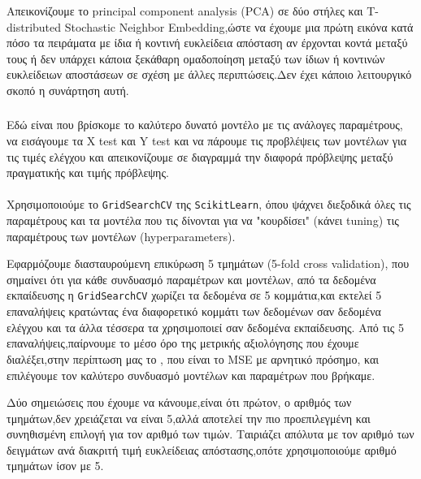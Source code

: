 Απεικονίζουμε το principal component analysis (PCA) σε δύο στήλες και T-distributed Stochastic Neighbor Embedding,ώστε 
να έχουμε μια πρώτη εικόνα κατά πόσο τα πειράματα με ίδια ή κοντινή ευκλείδεια απόσταση 
αν έρχονται κοντά μεταξύ τους ή δεν υπάρχει κάποια ξεκάθαρη ομαδοποίηση μεταξύ των ίδιων ή κοντινών ευκλείδειων αποστάσεων
σε σχέση με άλλες περιπτώσεις.Δεν έχει κάποιο λειτουργικό σκοπό η συνάρτηση αυτή.

\subsubsection{\texttt{}}

Εδώ είναι που βρίσκομε το καλύτερο δυνατό μοντέλο με τις ανάλογες παραμέτρους,
να εισάγουμε τα X test και Y test και να πάρουμε τις προβλέψεις των μοντέλων για τις τιμές ελέγχου
και απεικονίζουμε σε διαγραμμά την διαφορά πρόβλεψης μεταξύ πραγματικής και τιμής πρόβλεψης.

\paragraph{ \texttt{}}

Χρησιμοποιούμε το \texttt{GridSearchCV} της \texttt{Scikit\-Learn},
όπου ψάχνει διεξοδικά όλες τις παραμέτρους και τα μοντέλα που τις δίνονται για να "κουρδίσει" (κάνει tuning)
τις παραμέτρους των μοντέλων (hyperparameters).

Εφαρμόζουμε διασταυρούμενη επικύρωση 5 τμημάτων (5-fold cross validation), που σημαίνει ότι για κάθε συνδυασμό παραμέτρων και μοντέλων,
από τα δεδομένα εκπαίδευσης η \texttt{GridSearchCV} χωρίζει τα δεδομένα σε 5 κομμάτια,και εκτελεί 5 επαναλήψεις κρατώντας ένα διαφορετικό κομμάτι των δεδομένων σαν δεδομένα ελέγχου και τα
άλλα τέσσερα τα χρησιμοποιεί σαν δεδομένα εκπαίδευσης.
Από τις 5 επαναλήψεις,παίρνουμε το μέσο όρο της μετρικής αξιολόγησης που έχουμε διαλέξει,στην περίπτωση μας το \texttt{},
που είναι το MSE με αρνητικό πρόσημο, 
και επιλέγουμε τον καλύτερο συνδυασμό μοντέλων και παραμέτρων που βρήκαμε.

Δύο σημειώσεις που έχουμε να κάνουμε,είναι ότι πρώτον, ο αριθμός των τμημάτων,δεν χρειάζεται να είναι 5,αλλά αποτελεί την πιο προεπιλεγμένη και συνηθισμένη επιλογή 
για τον αριθμό των τιμών.
Ταιριάζει απόλυτα με τον αριθμό των δειγμάτων ανά διακριτή τιμή ευκλείδειας απόστασης,οπότε χρησιμοποιούμε αριθμό τμημάτων ίσον με 5. 

